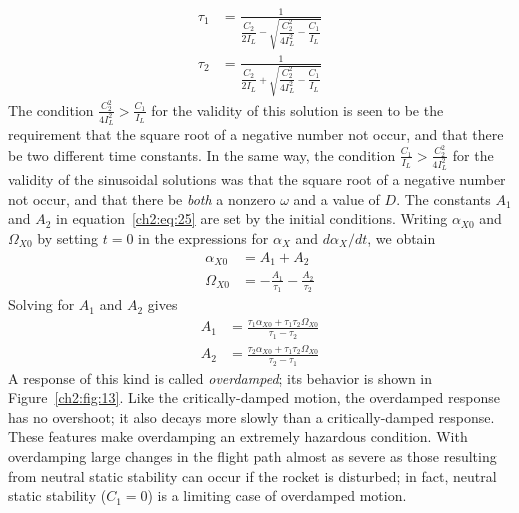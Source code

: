 \begin{equation}\label{ch2:eq:25}
\begin{aligned}
\tau_1 &= \frac{1}{\dfrac{C_2}{2 I_L} - \sqrt{\dfrac{C_2^{2}}{4 I_L^{2}} - \dfrac{C_1}{I_L}}}\\[8pt]
\tau_2 &= \frac{1}{\dfrac{C_2}{2 I_L} + \sqrt{\dfrac{C_2^{2}}{4 I_L^{2}} - \dfrac{C_1}{I_L}}}
\end{aligned}
\end{equation}
The condition $\frac{C_2^{2}}{4 I_L^{2}} > \frac{C_1}{I_L}$ for the validity of
this solution is seen to be the requirement that the square root of a negative
number not occur, and that there be two different time constants. In the same
way, the condition $\frac{C_1}{I_L} > \frac{C_2^{2}}{4 I_L^{2}}$ for the
validity of the sinusoidal solutions was that the square root of a negative
number not occur, and that there be \emph{both} a nonzero $\omega$ and a value
of $D$. The constants $A_1$ and $A_2$ in equation~\eqref{ch2:eq:25} are set by
the initial conditions. Writing $\alpha_{X0}$ and $\Omega_{X0}$ by setting
$t = 0$ in the expressions for $\alpha_X$ and $d\alpha_X/dt$, we obtain
\begin{align*}
\alpha_{X0} &= A_1 + A_2\\
\Omega_{X0} &= -\frac{A_1}{\tau_1} - \frac{A_2}{\tau_2}
\end{align*}
Solving for $A_1$ and $A_2$ gives
\begin{equation}\label{ch2:eq:26}
\begin{aligned}
A_1 &= \frac{\tau_1\alpha_{X0} + \tau_1\tau_2\Omega_{X0}}{\tau_1 - \tau_2}\\[4pt]
A_2 &= \frac{\tau_2\alpha_{X0} + \tau_1\tau_2\Omega_{X0}}{\tau_2 - \tau_1}
\end{aligned}
\end{equation}
A response of this kind is called \emph{overdamped}; its behavior is shown in
Figure~\ref{ch2:fig:13}. Like the critically-damped motion, the overdamped
response has no overshoot; it also decays more slowly than a critically-damped
response. These features make overdamping an extremely hazardous condition.
With overdamping large changes in the flight path almost as severe as those
resulting from neutral static stability can occur if the rocket is disturbed;
in fact, neutral static stability ($C_1 = 0$) is a limiting case of overdamped
motion.

